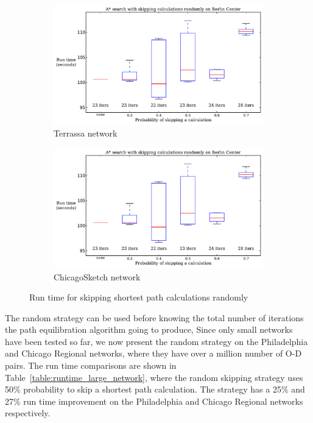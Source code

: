 \begin{figure}[H]
    \centering
    \begin{subfigure}{.5\textwidth}
        \centering
        \includegraphics[page=1,width=\textwidth]{img/random_time}
        \caption{Terrassa network}
        \label{fig:terrassa_random_n}
    \end{subfigure}%
    \begin{subfigure}{.5\textwidth}
        \centering
        \includegraphics[page=2,width=\textwidth]{img/random_time}
        \caption{ChicagoSketch network}
        \label{fig:chicago_random_n}
    \end{subfigure}
    \caption{Run time for skipping shortest path calculations randomly}
    \label{fig:random_n}
\end{figure}

The random strategy can be used before knowing the total number of iterations the path equilibration algorithm going to produce,
Since only small networks have been tested so far,
we now present the random strategy on the Philadelphia and Chicago Regional networks, where they have over a million number of O-D pairs.
The run time comparisons are shown in Table~\ref{table:runtime_large_network},
where the random skipping strategy uses 50\% probability to skip a shortest path calculation.
The strategy has a 25\% and 27\% run time improvement on the Philadelphia and Chicago Regional networks respectively.

